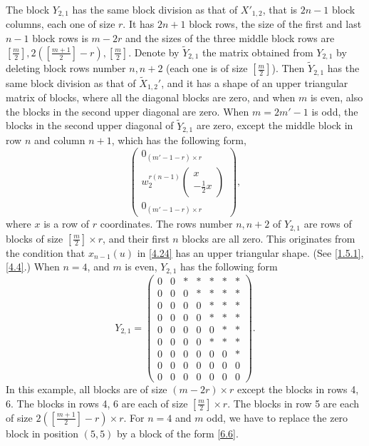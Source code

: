 \documentclass[12pts]{amsart}
\begin{document}
The block $Y_{2,1}$ has the same block division as that of $X'_{1,2}$, that is $2n-1$ block columns, each one of size $r$. It has $2n+1$ block rows, the size of the first and last
$n-1$ block rows is $m-2r$ and the sizes of
the three middle block rows are $[\frac{m}{2}],2([\frac{m+1}{2}]-r),[\frac{m}{2}]$. Denote by
$\widetilde{Y}_{2,1}$ the matrix obtained from $Y_{2,1}$ by deleting
block rows number $n, n+2$ (each one is of size $[\frac{m}{2}]$). Then
$\widetilde{Y}_{2,1}$ has the same block division as that of $\tilde{X}_{1,2}'$, and it has a shape of an upper triangular matrix of blocks, where all the diagonal blocks are zero, and when $m$ is even, also the blocks in the second upper diagonal are zero. When $m=2m'-1$ is odd, the blocks in the second upper diagonal of $\tilde{Y}_{2,1}$ are zero, except the middle block in row $n$ and column $n+1$, which has the following form,
 \begin{equation}\label{6.6}
\begin{pmatrix}0_{(m'-1-r)\times r}\\w_2^{r(n-1)}\begin{pmatrix}x\\-\frac{1}{2}x\end{pmatrix}\\0_{(m'-1-r)\times r}\end{pmatrix},
\end{equation}
where $x$ is a row of $r$ coordinates. The rows number $n, n+2$ of $Y_{2,1}$ are rows of blocks of size $[\frac{m}{2}]\times r$, and their first $n$ blocks are all zero. This originates from the condition that $x_{n-1}(u)$ in \eqref{4.24} has an upper triangular shape. (See \eqref{1.5.1}, \eqref{4.4}.) When $n=4$, and $m$ is even, $Y_{2,1}$ has the following form
\begin{equation}\label{6.6.0}
Y_{2,1}=\begin{pmatrix}0&0&\ast&\ast&\ast&\ast&\ast\\
0&0&0&\ast&\ast&\ast&\ast\\
0&0&0&0&\ast&\ast&\ast\\
0&0&0&0&\ast&\ast&\ast\\
0&0&0&0&0&\ast&\ast\\
0&0&0&0&\ast&\ast&\ast\\
0&0&0&0&0&0&\ast\\
0&0&0&0&0&0&0\\
0&0&0&0&0&0&0\end{pmatrix}. 
\end{equation}
In this example, all blocks are of size $(m-2r)\times r$ except the
blocks in rows 4, 6. The blocks in rows 4, 6 are each of size $[\frac{m}{2}]\times r$. The blocks in row 5 are each of size $2([\frac{m+1}{2}]-r)\times r$. For $n=4$ and $m$ odd, we have to replace the zero block in position $(5,5)$ by a block of the form \eqref{6.6}.
\end{document}
